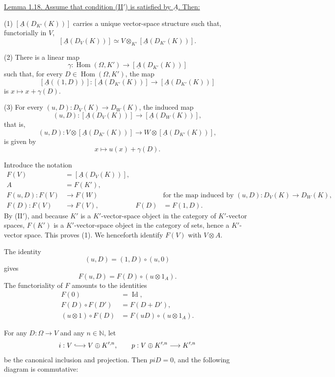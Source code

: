 
\underline{Lemma 1.18. Assume that condition (II$'$) is satisfied by
$\underline A$. Then:}

(1) $[\underline A(D_{K'}(K))]$ carries a unique vector-space
structure such that, functorially in $V$,
\[
 [\underline A(D_V(K))]
 \simeq
 V\otimes_{K'}[\underline A(D_{K'}(K))].
\]

(2) There is a linear map
\[
 \gamma:\operatorname{Hom}(\Omega,K')
 \longrightarrow [\underline A(D_{K'}(K))]
\]
such that, for every $D\in\operatorname{Hom}(\Omega,K')$, the map
\[
 [\underline A((1,D))]:
 [\underline A(D_{K'}(K))]
 \longrightarrow [\underline A(D_{K'}(K))]
\]
is $x\longmapsto x+\gamma(D)$.

(3) For every
$(u,D):D_V(K)\longrightarrow D_W(K)$, the induced map
\[
 (u,D):[\underline A(D_V(K))]
 \longrightarrow[\underline A(D_W(K))],
\]
that is,
\[
 (u,D):
 V\otimes[\underline A(D_{K'}(K))]
 \longrightarrow
 W\otimes[\underline A(D_{K'}(K))],
\]
is given by
\[
 x\longmapsto u(x)+\gamma(D).
\]

Introduce the notation
\[
\begin{aligned}
 F(V)&=[\underline A(D_V(K))],\\
 A&=F(K'),\\
 F(u,D):F(V)&\longrightarrow F(W)
   &&\text{for the map induced by }
     (u,D):D_V(K)\longrightarrow D_W(K),\\
 F(D):F(V)&\longrightarrow F(V),
   &F(D)&=F(1,D).
\end{aligned}
\]
By (II$'$), and because $K'$ is a $K'$-vector-space object in the
category of $K'$-vector spaces, $F(K')$ is a $K'$-vector-space object
in the category of sets, hence a $K'$-vector space. This proves (1).
We henceforth identify $F(V)$ with $V\otimes A$.

The identity
\[
 (u,D)=(1,D)\circ(u,0)
\]
gives
\[
 F(u,D)=F(D)\circ(u\otimes1_A).
\]
The functoriality of $F$ amounts to the identities
\[
\begin{aligned}
 F(0)&=\operatorname{Id},\\
 F(D)\circ F(D')&=F(D+D'),\\
 (u\otimes1)\circ F(D)
   &=F(uD)\circ(u\otimes1_A).
\end{aligned}
\]

For any $D:\Omega\longrightarrow V$ and any $n\in\mathbb N$, let
\[
 i:V\lhook\joinrel\longrightarrow V\oplus K'^{,n},
 \qquad
 p:V\oplus K'^{,n}\longrightarrow K'^{,n}
\]
be the canonical inclusion and projection. Then $piD=0$, and the
following diagram is commutative:

